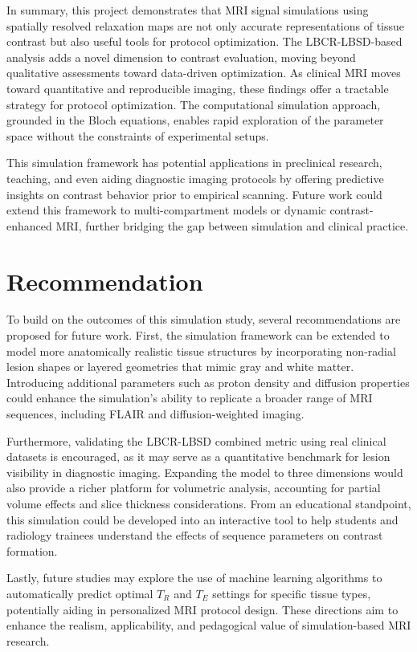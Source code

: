 \documentclass[10pt,a4paper,twoside]{article}
\begin{document}
In summary, this project demonstrates that MRI signal simulations using spatially resolved relaxation maps are not only accurate representations of tissue contrast but also useful tools for protocol optimization. The LBCR-LBSD-based analysis adds a novel dimension to contrast evaluation, moving beyond qualitative assessments toward data-driven optimization. As clinical MRI moves toward quantitative and reproducible imaging, these findings offer a tractable strategy for protocol optimization. The computational simulation approach, grounded in the Bloch equations, enables rapid exploration of the parameter space without the constraints of experimental setups. 

This simulation framework has potential applications in preclinical research, teaching, and even aiding diagnostic imaging protocols by offering predictive insights on contrast behavior prior to empirical scanning. Future work could extend this framework to multi-compartment models or dynamic contrast-enhanced MRI, further bridging the gap between simulation and clinical practice.


\section{Recommendation}
To build on the outcomes of this simulation study, several recommendations are proposed for future work. First, the simulation framework can be extended to model more anatomically realistic tissue structures by incorporating non-radial lesion shapes or layered geometries that mimic gray and white matter. Introducing additional parameters such as proton density and diffusion properties could enhance the simulation’s ability to replicate a broader range of MRI sequences, including FLAIR and diffusion-weighted imaging. 

Furthermore, validating the LBCR-LBSD combined metric using real clinical datasets is encouraged, as it may serve as a quantitative benchmark for lesion visibility in diagnostic imaging. Expanding the model to three dimensions would also provide a richer platform for volumetric analysis, accounting for partial volume effects and slice thickness considerations. From an educational standpoint, this simulation could be developed into an interactive tool to help students and radiology trainees understand the effects of sequence parameters on contrast formation. 

Lastly, future studies may explore the use of machine learning algorithms to automatically predict optimal $T_R$ and $T_E$ settings for specific tissue types, potentially aiding in personalized MRI protocol design. These directions aim to enhance the realism, applicability, and pedagogical value of simulation-based MRI research.







\end{document}
